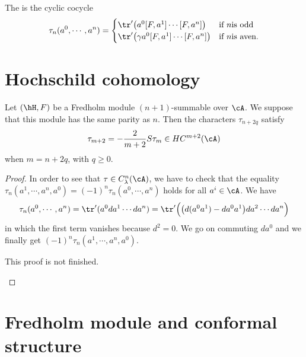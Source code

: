 The  is the cyclic cocycle
\begin{equation}
	\tau_n(a^0,\cdots,a^{n})=
	\begin{cases}
		\tr'\big( a^0[F,a^1]\cdots[F,a^{n}] \big)        & \text{if }n \text{is odd}   \\
		\tr'\big( \gamma a^0[F,a^1]\cdots[F,a^{n}] \big) & \text{if }n \text{is aven}.
	\end{cases}
\end{equation}

\section{Hochschild cohomology}

\begin{proposition}
	Let $(\hH,F)$ be a Fredholm module $(n+1)$-summable over $\cA$. We suppose that this module has the same parity as $n$. Then the characters $\tau_{n+2q}$ satisfy
	\begin{equation}
		\tau_{m+2}=-\frac{ 2 }{ m+2 }S\tau_m\in HC^{m+2}(\cA)
	\end{equation}
	when $m=n+2q$, with $q\geq 0$.
\end{proposition}

\begin{proof}
	In order to see that $\tau\in C^n_{\lambda}(\cA)$, we have to check that the equality $\tau_n(a^1,\cdots,a^{n},a^0)=(-1)^n\tau_n(a^0,\cdots,a^{n})$ holds for all $a^i\in\cA$. We have
	\[
		\tau_n(a^0,\cdots,a^{n})=\tr'(a^0da^1\cdots da^{n})=\tr'\Big( \big( d(a^0a^1)-da^0a^1 \big)da^2\cdots da^{n} \Big)
	\]
	in which the first term vanishes because $d^2=0$. We go on commuting $da^0$ and we finally get $(-1)^n\tau_n(a^1,\cdots,a^n,a^0)$.

	\begin{probleme}
		This proof is not finished.
	\end{probleme}

\end{proof}
\section{Fredholm module and conformal structure}

